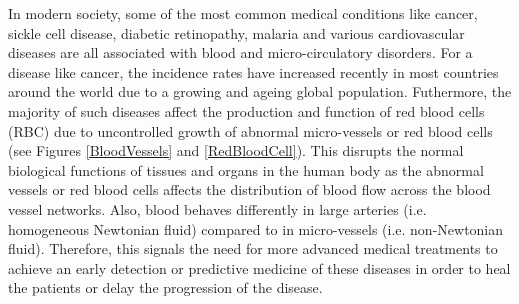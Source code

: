\noindent In modern society, some of the most common medical conditions like cancer, sickle cell disease\cite{suresh2006mechanical}, diabetic retinopathy, malaria\cite{mohandas2012malaria} and various cardiovascular diseases are all associated with blood and micro-circulatory disorders.\cite{abularrage2005evaluation} For a disease like cancer, the incidence rates have increased recently in most countries around the world due to a growing and ageing global population.\cite{GlobalBurdenofCancer} Futhermore, the majority of such diseases affect the production and function of red blood cells (RBC) due to uncontrolled growth of abnormal micro-vessels or red blood cells (see Figures \ref{BloodVessels} and \ref{RedBloodCell}). This disrupts the normal biological functions of tissues and organs in the human body as the abnormal vessels or red blood cells affects the distribution of blood flow across the blood vessel networks. Also, blood behaves differently in large arteries (i.e. homogeneous Newtonian fluid) compared to in micro-vessels (i.e. non-Newtonian fluid). Therefore, this signals the need for more advanced medical treatments to achieve an early detection or predictive medicine of these diseases in order to heal the patients or delay the progression of the disease.






